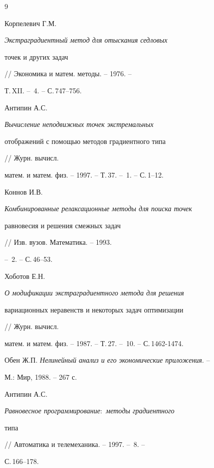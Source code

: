 \begin{thebibliography}{9} 


 




Корпелевич Г.М. {\em Экстраградиентный метод для отыскания седловых 


точек и других задач} // Экономика и матем. методы. -- 1976. -- 


Т.\,XII. -- \No\,4. -- С.\,747--756. 




Антипин А.С. {\em Вычисление неподвижных точек экстремальных 


отображений с помощью методов градиентного типа} // Журн. вычисл. 


матем. и матем. физ. -- 1997. -- Т.\,37. -- \No\,1. -- С.\,1--12. 




Коннов И.В. {\em Комбинированные релаксационные методы для поиска точек 


равновесия и решения смежных задач} // Изв. вузов. Математика. -- 1993. 


-- \No\,2. -- С.\,46--53. 




Хоботов Е.Н. {\em О модификации экстраградиентного метода для решения 


вариационных неравенств и некоторых задач оптимизации} // Журн. вычисл. 


матем. и матем. физ. -- 1987. -- Т.\,27. -- \No\,10. -- С.\,1462-1474. 




Обен Ж.П. {\em Нелинейный анализ и его экономические приложения}. -- 


М.: Мир, 1988. -- 267 с. 




Антипин А.С. {\em Равновесное программирование$:$ методы градиентного 


типа} // Автоматика и телемеханика. -- 1997. -- \No\,8. -- 


С.\,166--178. 


 


\end{thebibliography} 


 


\vskip 2cm 


 






 


\label{end} 


 


